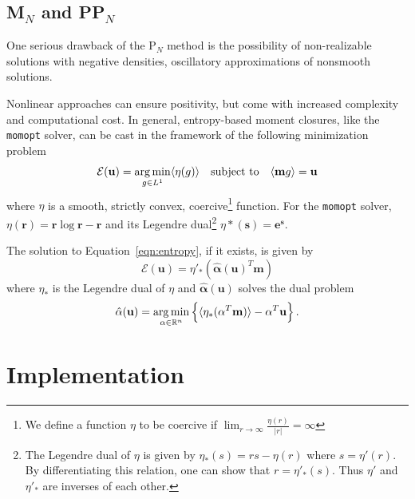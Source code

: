 \documentclass{article}
\newcommand{\R}{\ensuremath{\mathbb{R}}\xspace}
\newcommand{\integral}[1]{\ensuremath{\langle #1 \rangle}}
\newcommand{\momopt}{\texttt{momopt}\xspace}
\begin{document}
\subsection{M$_N$ and PP$_N$}
One serious drawback of the P$_N$ method is the possibility of non-realizable
solutions with negative densities, oscillatory approximations of nonsmooth
solutions. 

Nonlinear approaches can ensure positivity,
but come with increased complexity and computational cost. In general,
entropy-based moment closures, like the \momopt solver, can be cast in the
framework of the following minimization problem
\begin{equation}
    \label{eqn:entropy}
    \mathcal{E}(\mathbf{u}) = \argmin_{g \in L^1} \integral{\eta(g)} \quad
    \textnormal{subject to} \quad \integral{\mathbf{m}g} = \mathbf{u}
\end{equation}
where $\eta$ is a smooth, strictly convex, coercive\footnote{We define a
function $\eta$ to be coercive if
$\lim_{r \to \infty} \frac{\eta(r)}{|r|} = \infty$} function. For the
\momopt solver, $\eta(\mathbf{r}) = \mathbf{r} \log \mathbf{r} - \mathbf{r}$
and its Legendre dual\footnote{The Legendre dual of $\eta$ is given by
$\eta_*(s) = rs - \eta(r)$ where $s = \eta'(r)$. By differentiating this
relation, one can show that $r = \eta'_*(s)$. Thus $\eta'$ and $\eta'_*$ are
inverses of each other.} $\eta*(\mathbf{s}) = \mathbf{e^s}$.

The solution to Equation~\ref{eqn:entropy}, if it exists, is given by
\begin{equation}
    \mathcal{E}(\mathbf{u}) = \eta'_*(\hat{\mathbf{\alpha}}(\mathbf{u})^T \mathbf{m})
\end{equation}
where $\eta_*$ is the Legendre dual of $\eta$ and $\hat{\mathbf{\alpha}}(\mathbf{u})$
solves the dual problem
\begin{equation}
    \hat{\mathbf{\alpha}}(\mathbf{u}) = \argmin_{\mathbf{\alpha} \in \R^n}
    \left\{ \integral{\eta_*(\mathbf{\alpha}^T\mathbf{m})} -
    \mathbf{\alpha}^T \mathbf{u} \right\}.
\end{equation}

\section{Implementation}
\end{document}
